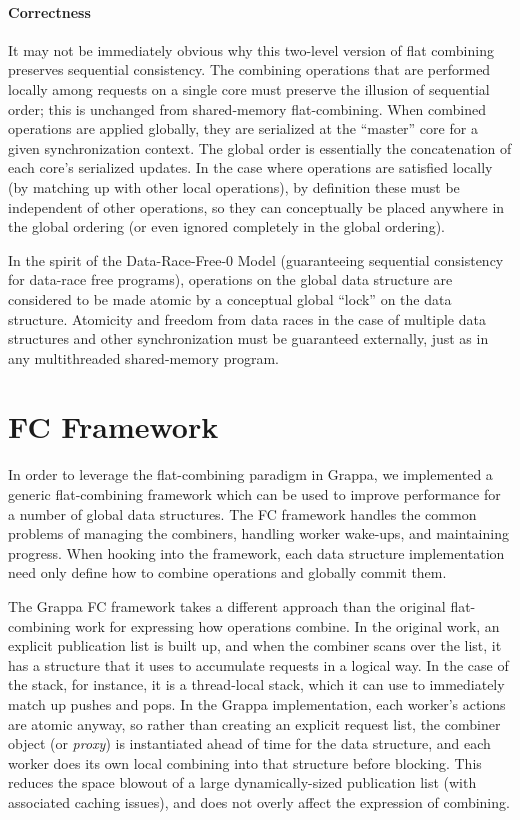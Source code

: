 \paragraph{Correctness}

It may not be immediately obvious why this two-level version of flat combining preserves sequential consistency. The combining operations that are performed locally among requests on a single core must preserve the illusion of sequential order; this is unchanged from shared-memory flat-combining. When combined operations are applied globally, they are serialized at the ``master'' core for a given synchronization context. The global order is essentially the concatenation of each core's serialized updates. In the case where operations are satisfied locally (by matching up with other local operations), by definition these must be independent of other operations, so they can conceptually be placed anywhere in the global ordering (or even ignored completely in the global ordering).

In the spirit of the Data-Race-Free-0 Model (guaranteeing sequential consistency for data-race free programs), operations on the global data structure are considered to be made atomic by a conceptual global ``lock'' on the data structure. Atomicity and freedom from data races in the case of multiple data structures and other synchronization must be guaranteed externally, just as in any multithreaded shared-memory program.

\section{FC Framework}
In order to leverage the flat-combining paradigm in Grappa, we implemented a generic flat-combining framework which can be used to improve performance for a number of global data structures. The FC framework handles the common problems of managing the combiners, handling worker wake-ups, and maintaining progress. When hooking into the framework, each data structure implementation need only define how to combine operations and globally commit them.

The Grappa FC framework takes a different approach than the original flat-combining work for expressing how operations combine. In the original work, an explicit publication list is built up, and when the combiner scans over the list, it has a structure that it uses to accumulate requests in a logical way. In the case of the stack, for instance, it is a thread-local stack, which it can use to immediately match up pushes and pops. In the Grappa implementation, each worker's actions are atomic anyway, so rather than creating an explicit request list, the combiner object (or \emph{proxy}) is instantiated ahead of time for the data structure, and each worker does its own local combining into that structure before blocking. This reduces the space blowout of a large dynamically-sized publication list (with associated caching issues), and does not overly affect the expression of combining.

